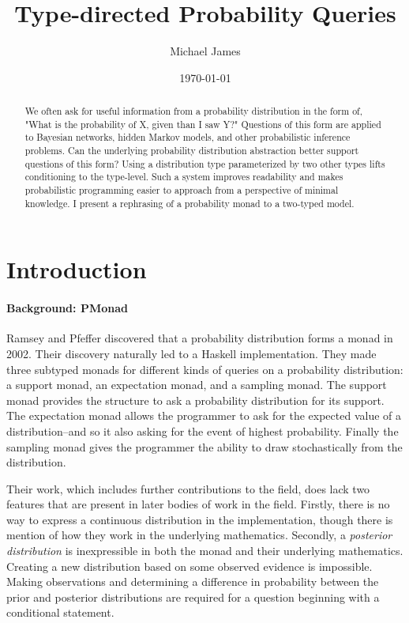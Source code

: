\documentclass[9pt,twocolumn]{article}
\title{Type-directed Probability Queries}
\author{Michael James}
\date{\today}
\begin{document}
\maketitle
\lstset{language=Haskell} 

\begin{abstract}
We often ask for useful information from a probability distribution in the form of, "What is the probability of X, given than I saw Y?" Questions of this form are applied to Bayesian networks, hidden Markov models, and other probabilistic inference problems. Can the underlying probability distribution abstraction better support questions of this form? Using a distribution type parameterized by two other types lifts conditioning to the type-level. Such a system improves readability and makes probabilistic programming easier to approach from a perspective of minimal knowledge. I present a rephrasing of a probability monad to a two-typed model.
\end{abstract}

\section{Introduction}
\paragraph{Background: PMonad}
Ramsey and Pfeffer discovered that a probability distribution forms a monad in 2002. Their discovery naturally led to a Haskell implementation. They made three subtyped monads for different kinds of queries on a probability distribution: a support monad, an expectation monad, and a sampling monad. The support monad provides the structure to ask a probability distribution for its support. The expectation monad allows the programmer to ask for the expected value of a distribution--and so it also asking for the event of highest probability. Finally the sampling monad gives the programmer the ability to draw stochastically from the distribution.

Their work, which includes further contributions to the field, does lack two features that are present in later bodies of work in the field. Firstly, there is no way to express a continuous distribution in the implementation, though there is mention of how they work in the underlying mathematics. Secondly, a \textit{posterior distribution} is inexpressible in both the monad and their underlying mathematics. Creating a new distribution based on some observed evidence is impossible. Making observations and determining a difference in probability between the prior and posterior distributions are required for a question beginning with a conditional statement.
\end{document}
